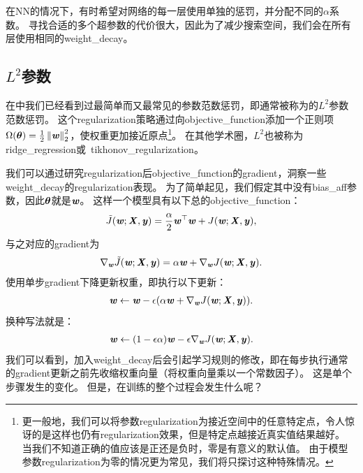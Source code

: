在\gls{NN}的情况下，有时希望对网络的每一层使用单独的惩罚，并分配不同的$\alpha$系数。
寻找合适的多个超参数的代价很大，因此为了减少搜索空间，我们会在所有层使用相同的\gls{weight_decay}。


\subsection{$L^2$参数}
\label{sec:l2_parameter_regularization}
在中我们已经看到过最简单而又最常见的参数范数惩罚，即通常被称为的$L^2$参数范数惩罚。
这个\gls{regularization}策略通过向\gls{objective_function}添加一个正则项$\Omega(\boldsymbol{\theta}) = \frac{1}{2} \left\lVert\boldsymbol{\mathit{w}}\right\rVert_2^2$，使权重更加接近原点\footnote{更一般地，我们可以将参数\gls{regularization}为接近空间中的任意特定点，令人惊讶的是这样也仍有\gls{regularization}效果，但是特定点越接近真实值结果越好。
当我们不知道正确的值应该是正还是负时，零是有意义的默认值。
由于模型参数\gls{regularization}为零的情况更为常见，我们将只探讨这种特殊情况。}。
在其他学术圈，$L^2$也被称为\gls{ridge_regression}或~\gls{tikhonov_regularization}。

我们可以通过研究\gls{regularization}后\gls{objective_function}的\gls{gradient}，洞察一些\gls{weight_decay}的\gls{regularization}表现。
为了简单起见，我们假定其中没有\gls{bias_aff}参数，因此$\boldsymbol{\theta}$就是$\boldsymbol{\mathit{w}}$。
这样一个模型具有以下总的\gls{objective_function}：
\begin{align}
  \tilde{J}(\boldsymbol{\mathit{w}};\boldsymbol{\mathit{X}}, \boldsymbol{\mathit{y}}) =\frac{\alpha}{2} \boldsymbol{\mathit{w}}^\top \boldsymbol{\mathit{w}} +  J(\boldsymbol{\mathit{w}};\boldsymbol{\mathit{X}}, \boldsymbol{\mathit{y}}),
\end{align}
与之对应的\gls{gradient}为
\begin{align}
 \nabla_{\boldsymbol{\mathit{w}}} \tilde{J}(\boldsymbol{\mathit{w}};\boldsymbol{\mathit{X}},\boldsymbol{\mathit{y}}) =\alpha \boldsymbol{\mathit{w}} +  \nabla_{\boldsymbol{\mathit{w}}} J(\boldsymbol{\mathit{w}};\boldsymbol{\mathit{X}}, \boldsymbol{\mathit{y}}).
\end{align}
使用单步\gls{gradient}下降更新权重，即执行以下更新：
\begin{align}
 \boldsymbol{\mathit{w}} \leftarrow \boldsymbol{\mathit{w}} - \epsilon(\alpha \boldsymbol{\mathit{w}} + \nabla_{\boldsymbol{\mathit{w}}} J(\boldsymbol{\mathit{w}};\boldsymbol{\mathit{X}}, \boldsymbol{\mathit{y}})).
\end{align}
换种写法就是：
\begin{align}
 \boldsymbol{\mathit{w}} \leftarrow (1-\epsilon \alpha)\boldsymbol{\mathit{w}} - \epsilon \nabla_{\boldsymbol{\mathit{w}}} J(\boldsymbol{\mathit{w}};\boldsymbol{\mathit{X}}, \boldsymbol{\mathit{y}}).
\end{align}
我们可以看到，加入\gls{weight_decay}后会引起学习规则的修改，即在每步执行通常的\gls{gradient}更新之前先收缩权重向量（将权重向量乘以一个常数因子）。
这是单个步骤发生的变化。
但是，在训练的整个过程会发生什么呢？


